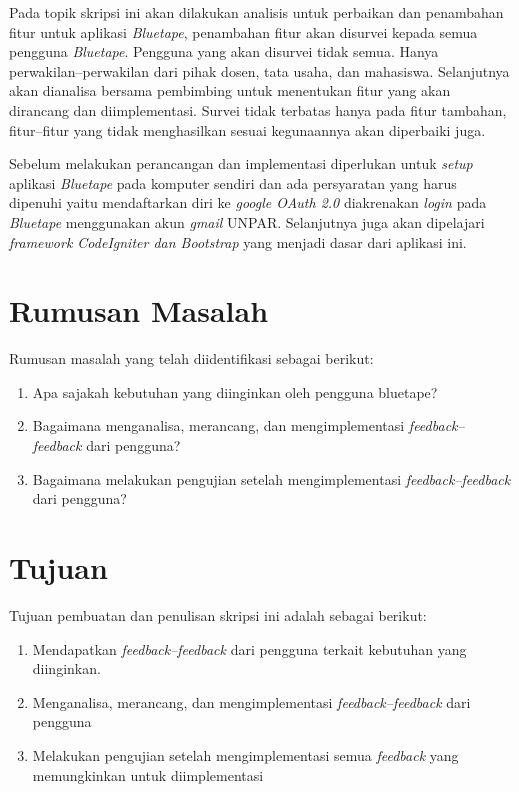 \documentclass[a4paper,twoside]{article}
\begin{document}
Pada topik skripsi ini akan dilakukan analisis untuk perbaikan dan penambahan fitur untuk aplikasi \textit{Bluetape}, penambahan fitur akan disurvei kepada semua pengguna \textit{Bluetape}. Pengguna yang akan disurvei tidak semua. Hanya perwakilan--perwakilan dari pihak dosen, tata usaha, dan mahasiswa. Selanjutnya akan dianalisa bersama pembimbing untuk menentukan fitur yang akan dirancang dan diimplementasi. Survei tidak terbatas hanya pada fitur tambahan, fitur--fitur yang tidak menghasilkan sesuai kegunaannya akan diperbaiki juga.


Sebelum melakukan perancangan dan implementasi diperlukan untuk \textit{setup} aplikasi \textit{Bluetape} pada komputer sendiri dan ada persyaratan yang harus dipenuhi yaitu mendaftarkan diri ke \textit{google OAuth 2.0} diakrenakan \textit{login} pada \textit{Bluetape} menggunakan akun \textit{gmail} UNPAR. Selanjutnya juga akan dipelajari \textit{framework CodeIgniter dan Bootstrap} yang menjadi dasar dari aplikasi ini.

\section{Rumusan Masalah}

Rumusan masalah yang telah diidentifikasi sebagai berikut:
\begin{enumerate}
	\item Apa sajakah kebutuhan yang diinginkan oleh pengguna bluetape?
	\item Bagaimana menganalisa, merancang, dan mengimplementasi \textit{feedback--feedback} dari pengguna?
	\item Bagaimana melakukan pengujian setelah mengimplementasi \textit{feedback--feedback} dari pengguna?
	
\end{enumerate}

\section{Tujuan}

Tujuan pembuatan dan penulisan skripsi ini adalah sebagai berikut:
\begin{enumerate}
	\item Mendapatkan \textit{feedback--feedback} dari pengguna terkait kebutuhan yang diinginkan.
	\item Menganalisa, merancang, dan mengimplementasi \textit{feedback--feedback} dari pengguna
	\item Melakukan pengujian setelah mengimplementasi semua \textit{feedback} yang memungkinkan untuk diimplementasi
	
\end{enumerate}
\end{document}
